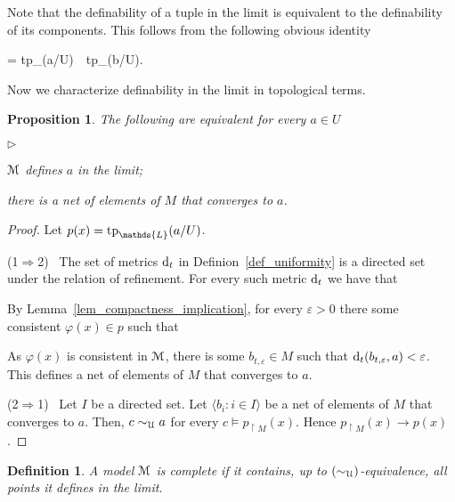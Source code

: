 \documentclass[12pt,letterpaper,oneside,reqno]{amsart}
\newcommand{\mylabel}[1]{{#1}\hfill}
\renewenvironment{itemize}
  {\begin{list}{$\triangleright$}{%
   \setlength{\parskip}{0mm}
   \setlength{\topsep}{.2\baselineskip}
   \setlength{\rightmargin}{0mm}
   \setlength{\listparindent}{0mm}
   \setlength{\itemindent}{0mm}
   \setlength{\labelwidth}{3ex}
   \setlength{\itemsep}{.2\baselineskip}
   \setlength{\parsep}{.2\baselineskip}
   \setlength{\partopsep}{0mm}
   \setlength{\labelsep}{1ex}
   \setlength{\leftmargin}{\labelwidth+\labelsep}
   \let\makelabel\mylabel}}{%
   \end{list}}
\theoremstyle{plain}
\newtheorem{proposition}[theorem]{Proposition}
\newtheorem{definition}[theorem]{Definition}
\theoremstyle{remark}
\begin{document}
Note that the definability of a tuple in the limit is equivalent to the definability of its components.
This follows from the following obvious identity

{=}
{{\rm tp}_(a/U)\ \cup\ {\rm tp}_(b/U).}

Now we characterize definability in the limit in topological terms.

\begin{proposition}
  The following are equivalent for every $a\in U$
  \begin{itemize}
    \item[1.] ${\EuScript M}$ defines $a$ in the limit;
    \item[2.] there is a net of elements of $M$ that converges to $a$. 
  \end{itemize}
\end{proposition}

\begin{proof}
  Let $p(x)={\rm tp}_\mathds{L}(a/U)$.

  (1$\Rightarrow$2) \ 
  The set of metrics ${\rm d}_t$ in Definion~\ref{def_uniformity} is a directed set under the relation of refinement.
  For every such metric ${\rm d}_t$ we have that


  By Lemma~\ref{lem_compactness_implication}, for every $\varepsilon>0$ there some consistent $\varphi(x)\in p$ such that


  As $\varphi(x)$ is consistent in ${\EuScript M}$, there is some $b_{t,\varepsilon}\in M$ such that ${\rm d}_t(b_{t,\varepsilon},a)<\varepsilon$.
  This defines a net of elements of $M$ that converges to $a$.

  (2$\Rightarrow$1) \ 
  Let $I$ be a directed set.
  Let $\langle b_i:i\in I\rangle$ be a net of elements of $M$ that converges to $a$.
  Then, $c\sim_{\EuScript U} a$ for every $c\models p_{\restriction M}(x)$.
  Hence $p_{\restriction M}(x)\rightarrow p(x)$.
\end{proof}

\begin{definition}
  A model ${\EuScript M}$ is complete if it contains, up to $(\sim_{\EuScript U})$-equivalence, all points it defines in the limit.
\end{definition}
\end{document}
